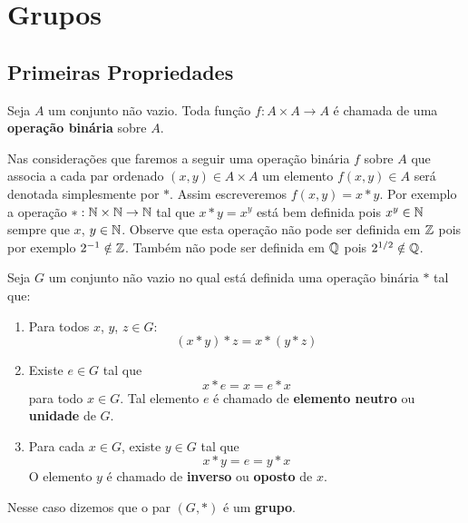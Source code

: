 \chapter{Grupos}

\section{Primeiras Propriedades} %
\label{sec:primeiras_propriedades}

\begin{definicao}
   Seja $A$ um conjunto n\~ao vazio. Toda fun\c{c}\~ao $f : A \times A \to A$ \'e chamada de uma \textbf{opera\c{c}\~ao bin\'aria} sobre $A$.
\end{definicao}

Nas considera\c{c}\~oes que faremos a seguir uma opera\c{c}\~ao bin\'aria $f$ sobre $A$ que associa a cada par ordenado $(x, y) \in A \times A$ um elemento $f(x, y) \in A$ ser\'a denotada simplesmente por $*$. Assim escreveremos $f(x, y) = x*y$. Por exemplo a opera\c{c}\~ao $* : \mathbb{N} \times \mathbb{N} \to \mathbb{N}$ tal que $x*y = x^y$ est\'a bem definida pois $x^y \in \mathbb{N}$ sempre que $x$, $y \in \mathbb{N}$. Observe que esta opera\c{c}\~ao n\~ao pode ser definida em $\mathbb{Z}$ pois por exemplo $2^{-1} \notin \mathbb{Z}$. Tamb\'em n\~ao pode ser definida em $\mathbb{Q}$ pois $2^{1/2} \notin \mathbb{Q}$.

\begin{definicao}
	Seja $G$ um conjunto n{\~a}o vazio no qual est\'a definida uma opera{\c c}{\~a}o bin{\'a}ria $*$ tal que:
	\begin{enumerate}[label={\roman*})]
		\item Para todos $x$, $y$, $z\in G$:
		\[
			(x*y)*z=x*(y*z)
		\]
		
		\item Existe $e \in G$ tal que
		\[
			x*e = x = e*x
		\]
		para todo $x \in G$. Tal elemento $e$ {\'e} chamado de \textbf{elemento neutro} ou \textbf{unidade} de $G$.

		\item Para cada $x \in G$, existe $y \in G$ tal que
		\[
			x*y = e = y*x
		\]
		O elemento $y$ {\'e} chamado de \textbf{inverso} ou \textbf{oposto} de $x$.
	\end{enumerate}
	Nesse caso dizemos que o par $(G, *)$ \'e um \textbf{grupo}.
\end{definicao}

